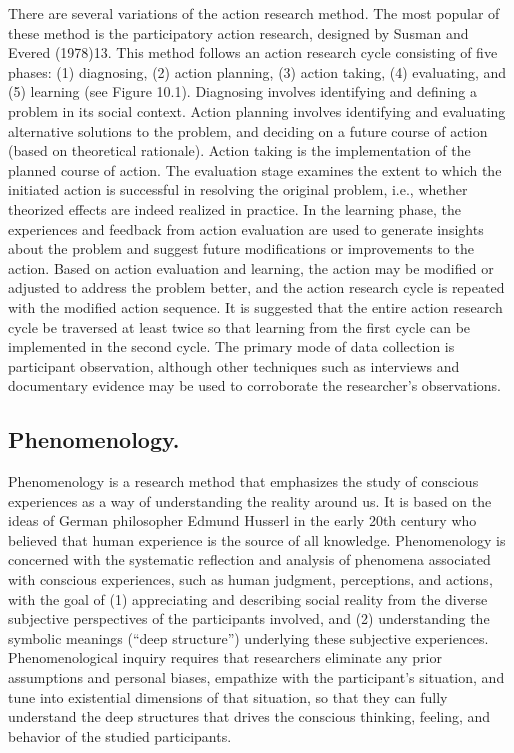 There are several variations of the action research method. The most popular of these method is the participatory action research, designed by Susman and Evered (1978)13. This method follows an action research cycle consisting of five phases: (1) diagnosing, (2) action planning, (3) action taking, (4) evaluating, and (5) learning (see Figure 10.1). Diagnosing involves identifying and defining a problem in its social context. Action planning involves identifying and evaluating alternative solutions to the problem, and deciding on a future course of action (based on theoretical rationale). Action taking is the implementation of the planned course of action. The evaluation stage examines the extent to which the initiated action is successful in resolving the original problem, i.e., whether theorized effects are indeed realized in practice. In the learning phase, the experiences and feedback from action evaluation are used to generate insights about the problem and suggest future modifications or improvements to the action. Based on action evaluation and learning, the action may be modified or adjusted to address the problem better, and the action research cycle is repeated with the modified action sequence. It is suggested that the entire action research cycle be traversed at least twice so that learning from the first cycle can be implemented in the second cycle. The primary mode of data collection is participant observation, although other techniques such as interviews and documentary evidence may be used to corroborate the researcher’s observations.



\subsection{Phenomenology.} Phenomenology is a research method that emphasizes the study of conscious experiences as a way of understanding the reality around us. It is based on the ideas of German philosopher Edmund Husserl in the early 20th century who believed that human experience is the source of all knowledge. Phenomenology is concerned with the systematic reflection and analysis of phenomena associated with conscious experiences, such as human judgment, perceptions, and actions, with the goal of (1) appreciating and describing social reality from the diverse subjective perspectives of the participants involved, and (2) understanding the symbolic meanings (“deep structure”) underlying these subjective experiences. Phenomenological inquiry requires that researchers eliminate any prior assumptions and personal biases, empathize with the participant’s situation, and tune into existential dimensions of that situation, so that they can fully understand the deep structures that drives the conscious thinking, feeling, and behavior of the studied participants.

